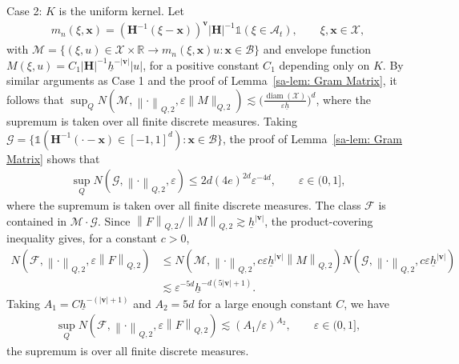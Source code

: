 \documentclass[10pt]{article}
\DeclareMathOperator{\diam}{diam}
\newcommand{\Indicator}{\mathds{1}}
\newcommand{\reals}{\mathbb{R}}
\newcommand{\norm}[1]{\left\lVert#1\right\rVert}
\newcommand{\bH}{\mathbf{H}}
\newcommand{\bv}{\mathbf{v}}
\newcommand{\bx}{\mathbf{x}}
\newcommand{\A}{\mathcal{A}}
\newcommand{\B}{\mathcal{B}}
\newcommand{\F}{\mathcal{F}}
\newcommand{\G}{\mathcal{G}}
\newcommand{\M}{\mathcal{M}}
\newcommand{\X}{\mathcal{X}}
\begin{document}
Case 2: $K$ is the uniform kernel. Let
\begin{align*}
    m_n(\xi, \bx) =  (\bH^{-1}(\xi - \bx))^{\bv} |\bH|^{-1} \Indicator(\xi \in \A_t), \qquad \xi, \bx \in \mathcal{X},
\end{align*}
with $\M = \{(\xi,u) \in \X \times \reals \to m_n(\xi,\bx)u: \bx \in \B\}$ and envelope function $M(\xi,u) = C_1 |\bH|^{-1}\underline h^{-|\bv|} |u|$, for a positive constant $C_1$ depending only on $K$. By similar arguments as Case 1 and the proof of Lemma~\ref{sa-lem: Gram Matrix}, it follows that $\sup_Q N(\M, \norm{\cdot}_{Q,2}, \varepsilon \|M\|_{Q,2}) \lesssim \big(\frac{\diam(\X)}{\varepsilon \underline h}\big)^d$, where the supremum is taken over all finite discrete measures. Taking $\G = \{\Indicator(\bH^{-1}(\cdot - \bx) \in [-1,1]^d): \bx \in \B\}$, the proof of Lemma~\ref{sa-lem: Gram Matrix} shows that
\begin{align*}
    \sup_Q N(\G, \norm{\cdot}_{Q,2}, \varepsilon) \leq 2d (4 e)^{2d} \varepsilon^{-4d}, \qquad \varepsilon \in (0,1],
\end{align*}
where the supremum is taken over all finite discrete measures. The class $\F$ is contained in $\M\cdot\G$. Since $\norm{F}_{Q,2}/\norm{M}_{Q,2}\gtrsim\underline h^{|\bv|}$, the product-covering inequality gives, for a constant $c>0$,
\begin{align*}
    N(\F, \norm{\cdot}_{Q,2}, \varepsilon \norm{F}_{Q,2})
    &\leq
    N(\M, \norm{\cdot}_{Q,2}, c\varepsilon\underline h^{|\bv|}\norm{M}_{Q,2})
    N(\G, \norm{\cdot}_{Q,2}, c\varepsilon\underline h^{|\bv|})\\
    &\lesssim
    \varepsilon^{-5d}\underline h^{-d(5|\bv|+1)}.
\end{align*}
Taking $A_1 = C\underline h^{-(|\bv|+1)}$ and $A_2 = 5d$ for a large enough constant $C$, we have
\begin{align*}
    \sup_Q N(\F, \norm{\cdot}_{Q,2}, \varepsilon \norm{F}_{Q,2}) \lesssim (A_1/ \varepsilon)^{A_2}, \qquad \varepsilon \in (0,1],
\end{align*}
the supremum is over all finite discrete measures.
\end{document}
